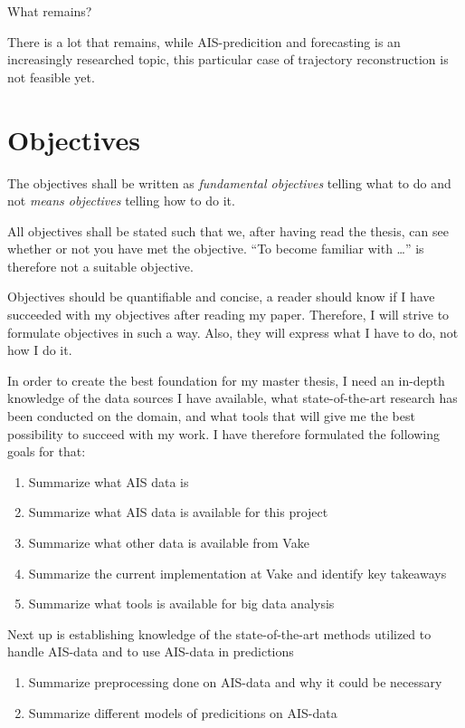 \begin{info}
	What remains?
\end{info}
There is a lot that remains, while AIS-predicition and forecasting is an increasingly researched topic, this particular case of trajectory reconstruction is not feasible yet.





\section{Objectives}
\label{sec:objectives}
\begin{info}
	The objectives shall be written as \emph{fundamental objectives} telling what to do and not \emph{means objectives} telling how to do it.

	All objectives shall be stated such that we, after having read the thesis, can see whether or not you have met the objective. ``To become familiar with \ldots'' is therefore not a suitable objective.
\end{info}
Objectives should be quantifiable and concise, a reader should know if I have succeeded with my objectives after reading my paper. Therefore, I will strive to formulate objectives in such a way. Also, they will express what I have to do, not how I do it. 

In order to create the best foundation for my master thesis, I need an in-depth knowledge of the data sources I have available, what state-of-the-art research has been conducted on the domain, and what tools that will give me the best possibility to succeed with my work. I have therefore formulated the following goals for that:
\begin{enumerate}
	\item Summarize what AIS data is
	\item Summarize what AIS data is available for this project
	\item Summarize what other data is available from Vake
	\item Summarize the current implementation at Vake and identify key takeaways
	\item Summarize what tools is available for big data analysis
\end{enumerate}

Next up is establishing knowledge of the state-of-the-art methods utilized to handle AIS-data and to use AIS-data in predictions
\begin{enumerate}
	\item Summarize preprocessing done on AIS-data and why it could be necessary
	\item Summarize different models of predicitions on AIS-data
\end{enumerate}

